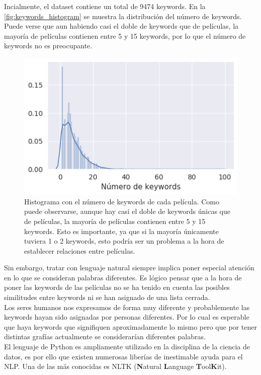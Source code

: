 Incialmente, el dataset contiene un total de 9474 keywords. En la \autoref{fig:keywords_histogram} se muestra la distribución del número de keywords. Puede verse que aun habiendo casi el doble de keywords que de películas, la mayoría de películas contienen entre 5 y 15 keywords, por lo que el número de keywords no es preocupante.
\begin{figure}[H]
    \centering
    \captionsetup{width=10cm}
    \includegraphics[width=12cm]{contenido/imagenes/keyword_histogram.png}
    \caption{Histograma con el número de keywords de cada película. Como puede observarse, aunque hay casi el doble de keywords únicas que de películas, la mayoría de películas contienen entre 5 y 15 keywords. Esto es importante, ya que si la mayoría únicamente tuviera 1 o 2 keywords, esto podría ser un problema a la hora de establecer relaciones entre películas.}
    \label{fig:keywords_histogram}
\end{figure}

Sin embargo, tratar con lenguaje natural siempre implica poner especial atención en lo que se consideran palabras diferentes. Es lógico pensar que a la hora de poner las keywords de las películas no se ha tenido en cuenta las posibles similitudes entre keywords ni se han asignado de una lista cerrada.\\

Los seres humanos nos expresamos de forma muy diferente y probablemente las keywords hayan sido asignadas por personas diferentes. Por lo cual es esperable que haya keywords que signifiquen aproximadamente lo mismo pero que por tener distintas grafías actualmente se considerarían diferentes palabras.\\

El lenguaje de Python es ampliamente utilizado en la disciplina de la ciencia de datos, es por ello que existen numerosas liberías de inestimable ayuda para el NLP. Una de las más conocidas es NLTK \cite{NLTK} (\textbf{N}atural \textbf{L}anguage \textbf{T}ool\textbf{K}it).\\

